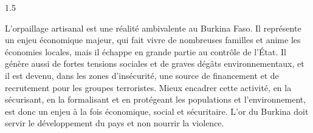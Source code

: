 \documentclass[12pt]{article}
\begin{document}
\begin{spacing}{1.5}

L'orpaillage artisanal est une réalité ambivalente au Burkina Faso. Il représente un enjeu économique majeur, qui fait vivre de nombreuses familles et anime les économies locales, mais il échappe en grande partie au contrôle de l'État. Il génère aussi de fortes tensions sociales et de graves dégâts environnementaux, et il est devenu, dans les zones d'insécurité, une source de financement et de recrutement pour les groupes terroristes. Mieux encadrer cette activité, en la sécurisant, en la formalisant et en protégeant les populations et l'environnement, est donc un enjeu à la fois économique, social et sécuritaire. L'or du Burkina doit servir le développement du pays et non nourrir la violence.

\end{spacing}
\end{document}
